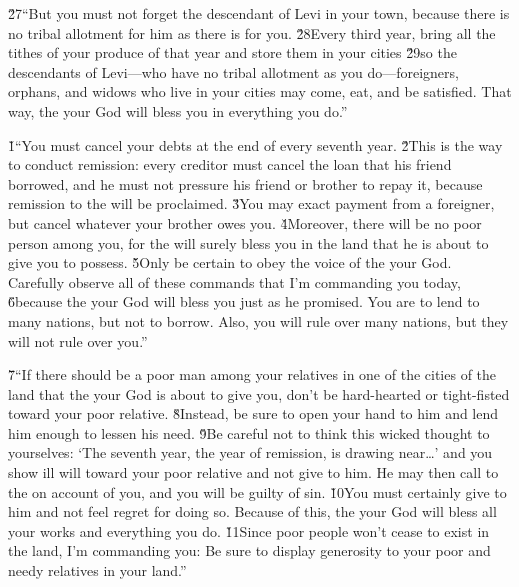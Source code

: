 \v{27}``But you must not forget the descendant of Levi in your town, because there is no tribal allotment for him as there is for you. \v{28}Every third year, bring all the tithes of your produce of that year and store them in your cities \v{29}so the descendants of Levi---who have no tribal allotment as you do---foreigners, orphans, and widows who live in your cities may come, eat, and be satisfied. That way, the  your God will bless you in everything you do.''

\v{1}``You must cancel your debts at the end of every seventh year. \v{2}This is the way to conduct remission: every creditor must cancel the loan that his friend borrowed, and he must not pressure his friend or brother to repay it, because remission to the  will be proclaimed. \v{3}You may exact payment from a foreigner, but cancel whatever your brother owes you. \v{4}Moreover, there will be no poor person among you, for the  will surely bless you in the land that he is about to give you to possess. \v{5}Only be certain to obey the voice of the  your God. Carefully observe all of these commands that I'm commanding you today, \v{6}because the  your God will bless you just as he promised. You are to lend to many nations, but not to borrow. Also, you will rule over many nations, but they will not rule over you.''

\v{7}``If there should be a poor man among your relatives in one of the cities of the land that the  your God is about to give you, don't be hard-hearted or tight-fisted toward your poor relative. \v{8}Instead, be sure to open your hand to him and lend him enough to lessen his need. \v{9}Be careful not to think this wicked thought to yourselves: `The seventh year, the year of remission, is drawing near{\ldots}' and you show ill will toward your poor relative and not give to him. He may then call to the  on account of you, and you will be guilty of sin. \v{10}You must certainly give to him and not feel regret for doing so. Because of this, the  your God will bless all your works and everything you do. \v{11}Since poor people won't cease to exist in the land, I'm commanding you: Be sure to display generosity to your poor and needy relatives in your land.''

